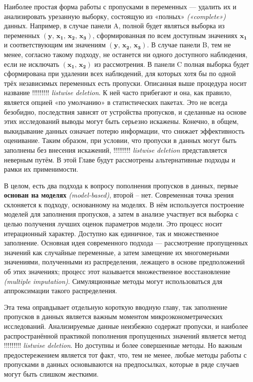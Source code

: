 Наиболее простая форма работы с пропусками в переменных --– удалить их и анализировать урезанную выборку, состоящую из «полных» \emph{(«complete»)} данных. Например, в случае панели A, полной будет являться выборка из переменных $(\mathbf{y, \, x_1, \, x_2, \, x_3})$, сформированная по всем доступным значениях $\mathbf{x_1}$ и соответствующим им значениям $(\mathbf{y, \, x_2, \, x_3})$. В случае панели B, тем не менее, согласно такому подходу, не останется ни одного доступного наблюдения, если не исключать $(\mathbf{x_1, \, x_2})$ из рассмотрения. В панели C полная выборка будет сформирована при удалении всех наблюдений, для которых хотя бы по одной трёх независимых переменных есть пропуски.
Описанная выше процедура носит название !!!!!!!!! \emph{listwise deletion}. К ней часто прибегают и она, как правило, является опцией «по умолчанию» в статистических пакетах. Это не всегда безобидно, последствия зависят от устройства пропусков, и сделанные на основе этих исследований выводы могут быть серьезно искажены. Конечно, в общем, выкидывание данных означает потерю информации, что снижает эффективность оценивание. Таким образом, при условии, что пропуски в данных могут быть заполнены без внесения искажений, !!!!!!!!! \emph{listwise deletion} представляется неверным путём. В этой Главе будут рассмотрены альтернативные подходы и рамки их применимости.

В целом, есть два подхода к вопросу пополнения пропусков в данных, первые {\bf основан на моделях} \emph{(model-based)}, второй – нет. Современная точка зрения склоняется к подходу, основанному на моделях. В нём используется построение моделей для заполнения пропусков, а затем в анализе участвует вся выборка с целью получения лучших оценок параметров модели.  Это процесс носит итерационный характер. Доступно как единичное, так и множественное заполнение. Основная идея современного подхода –-- рассмотрение пропущенных значений как случайные переменные, а затем замещение их многомерными значениями, полученными из распределения, лежащего в основе предположений об этих значениях; процесс этот называется множественное восстановление \emph{(multiple imputation)}. Симуляционные методы могут использоваться для аппроксимации такого распределения.

Эта тема оправдывает отдельную короткую вводную главу, так заполнение пропусков в данных является важным моментом микроэконометрических исследований. Анализируемые данные неизбежно содержат пропуски, и наиболее распространённой практикой пополнения пропущенных значений является метод !!!!!!!!! \emph{listwise deletion}. Но доступны и более совершенные методы. Но важным предостережением является тот факт, что, тем не менее, любые методы работы с пропусками в данных основываются на предпосылках, которые в ряде случаев могут быть слишком жесткими.


